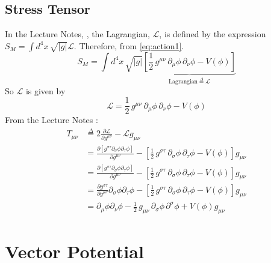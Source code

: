 \documentclass[]{article}
\newcommand{\Lagr}{\mathscr{L}}
\begin{document}
\subsection{Stress Tensor} \label{subseq:StressTensor}
In the Lecture Notes, \cite[Lecture III, Section 3]{akhmedev2016}, the Lagrangian, $\Lagr$, is defined by the expression $S_M = \int d^4x \, \sqrt{|g|} \Lagr$. Therefore, from \ref{eq:action1}. 
\begin{equation}
S_M = \int d^4x \, \sqrt{|g|} \underbrace{\left[\frac12 \, g^{\mu\nu} \, \partial_\mu \phi \, \partial_\nu \phi - V(\phi)\right]}_{\text{Lagrangian}\overset{\Delta}{=}\Lagr}
\end{equation}
So $\Lagr$ is given by
\begin{equation}
\Lagr=\frac12 \, g^{\mu\nu} \, \partial_\mu \phi \, \partial_\nu \phi - V(\phi)
\end{equation}
From the Lecture Notes \cite[(74)]{akhmedev2016}:
\begin{align}
T_{\mu\nu}&\overset{\Delta}{=}2 \frac{\partial \Lagr}{\partial g^{\mu\nu}} - \Lagr g_{\mu\nu} \nonumber \\
&=\frac{\partial [g^{\sigma\tau}\partial_\sigma \phi \partial_\tau \phi]}{\partial g^{\mu\nu}}-[\frac12 \, g^{\sigma\tau} \, \partial_\sigma \phi \, \partial_\tau \phi - V(\phi)] g_{\mu\nu} \nonumber \\
&=\frac{\partial [g^{\sigma\tau}\partial_\sigma \phi \partial_\tau \phi]}{\partial g^{\mu\nu}}-[\frac12 \, g^{\sigma\tau} \, \partial_\sigma \phi \, \partial_\tau \phi - V(\phi)] g_{\mu\nu} \nonumber\\
&=\frac{\partial g^{\sigma\tau}}{\partial g^{\mu\nu}}\partial_\sigma \phi \partial_\tau \phi-[\frac12 \, g^{\sigma\tau} \, \partial_\sigma \phi \, \partial_\tau \phi - V(\phi)] g_{\mu\nu} \nonumber \\
&=\partial_\mu \phi \partial_\nu \phi - \frac12 \, g_{\mu\nu} \, \partial_\sigma \phi \, \partial^\sigma \phi  + V(\phi) g_{\mu\nu} 
\end{align}

\section{Vector Potential}
\end{document}
